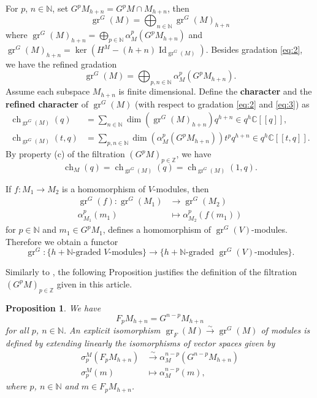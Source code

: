 \documentclass[12pt, a4paper]{article}
\newtheorem{proposition}{Proposition}
\DeclareMathOperator{\Id}{Id}
\DeclareMathOperator{\gr}{gr}
\DeclareMathOperator{\ch}{ch}
\begin{document}
For $p$, $n \in \mathbb{N}$, set $G^pM_{h + n} = G^pM \cap M_{h + n}$, then
\begin{equation}
  \label{eq:2}
  \gr^G(M)=\bigoplus_{n\in \mathbb{N}}\gr^G(M)_{h+n}
\end{equation}
where $\gr^G(M)_{h + n} = \bigoplus_{p \in \mathbb{N}}\alpha^p_M(G^pM_{h + n})$ and $\gr^G(M)_{h + n} = \ker(H^M - (h + n)\Id_{\gr^G(M)})$.
Besides gradation \eqref{eq:2}, we have the refined gradation
\begin{equation}
  \label{eq:3}
  \gr^G(M) = \bigoplus_{p, n \in \mathbb{N}}\alpha^p_M(G^pM_{h + n}).
\end{equation}
Assume each subspace $M_{h + n}$ is finite dimensional.
Define the \textbf{character} and the \textbf{refined character} of $\gr^G(M)$ (with respect to gradation \eqref{eq:2} and \eqref{eq:3}) as
\begin{align*}
  \ch_{\gr^G(M)}(q) &= \sum_{n \in \mathbb{N}}\dim(\gr^G(M)_{h + n})q^{h + n} \in q^h\mathbb{C}[[q]],\\
  \ch_{\gr^G(M)}(t, q) &= \sum_{p, n \in \mathbb{N}}\dim(\alpha^p_M(G^pM_{h + n}))t^pq^{h + n} \in q^{h}\mathbb{C}[[t, q]].
\end{align*}
By property (c) of the filtration $(G^pM)_{p\in \mathbb{Z}}$, we have
\begin{equation*}
  \ch_M(q) = \ch_{\gr^G(M)}(q) = \ch_{\gr^G(M)}(1, q).
\end{equation*}

If $f: M_1 \to M_2$ is a homomorphism of $V$-modules, then
\begin{align*}
  \gr^G(f): \gr^G(M_1) &\to \gr^G(M_2) \\
  \alpha^p_{M_1}(m_1) &\mapsto \alpha^p_{M_2}(f(m_1))
\end{align*}
for $p\in \mathbb{N}$ and $m_1\in G^pM_1$, defines a homomorphism of $\gr^G(V)$-modules.
Therefore we obtain a functor
\begin{equation*}
  \gr^G: \{\text{$h + \mathbb{N}$-graded $V$-modules}\} \to \{\text{$h + \mathbb{N}$-graded $\gr^G(V)$-modules}\}.
\end{equation*}

Similarly to , the following Proposition justifies the definition of the filtration $(G^pM)_{p\in \mathbb{Z}}$ given in this article.

\begin{proposition}
  \label{prp:4}
  We have
  \begin{equation*}
    F_pM_{h + n} = G^{n - p}M_{h + n}
  \end{equation*}
  for all $p$, $n \in \mathbb{N}$.
  An explicit isomorphism $\gr_F(M) \xrightarrow{\sim} \gr^G(M)$ of modules is defined by extending linearly the isomorphisms of vector spaces given by
  \begin{align*}
    \sigma^M_p(F_pM_{h + n}) &\xrightarrow{\sim} \alpha^{n - p}_M(G^{n - p}M_{h + n}) \\
    \sigma^M_p(m) &\mapsto \alpha^{n - p}_M(m),
  \end{align*}
  where $p$, $n\in \mathbb{N}$ and $m \in F_pM_{h + n}$.
\end{proposition}
\end{document}
